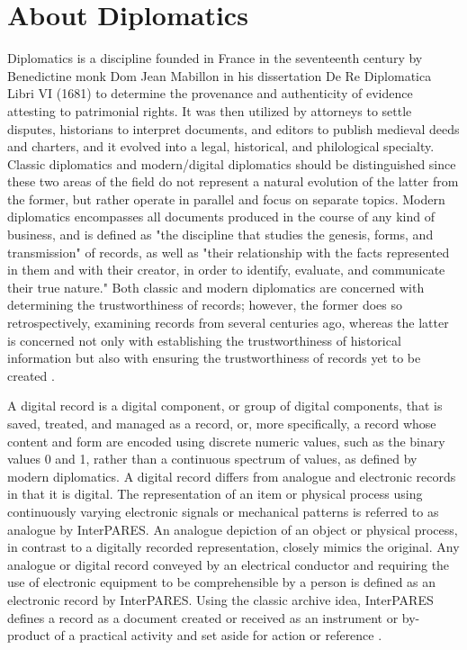 \section{About Diplomatics}
Diplomatics is a discipline founded in France in the seventeenth century by Benedictine monk Dom Jean Mabillon in his dissertation De Re Diplomatica Libri VI (1681) to determine the provenance and authenticity of evidence attesting to patrimonial rights. It was then utilized by attorneys to settle disputes, historians to interpret documents, and editors to publish medieval deeds and charters, and it evolved into a legal, historical, and philological specialty.
Classic diplomatics and modern/digital diplomatics should be distinguished since these two areas of the field do not represent a natural evolution of the latter from the former, but rather operate in parallel and focus on separate topics. Modern diplomatics encompasses all documents produced in the course of any kind of business, and is defined as "the discipline that studies the genesis, forms, and transmission" of records, as well as "their relationship with the facts represented in them and with their creator, in order to identify, evaluate, and communicate their true nature."
Both classic and modern diplomatics are concerned with determining the trustworthiness of records; however, the former does so retrospectively, examining records from several centuries ago, whereas the latter is concerned not only with establishing the trustworthiness of historical information but also with ensuring the trustworthiness of records yet to be created \cite[10]{kirschenbaum2010digital}. 

A digital record is a digital component, or group of digital components, that is saved, treated, and managed as a record, or, more specifically, a record whose content and form are encoded using discrete numeric values, such as the binary values 0 and 1, rather than a continuous spectrum of values, as defined by modern diplomatics. A digital record differs from analogue and electronic records in that it is digital. The representation of an item or physical process using continuously varying electronic signals or mechanical patterns is referred to as analogue by InterPARES.
An analogue depiction of an object or physical process, in contrast to a digitally recorded representation, closely mimics the original. Any analogue or digital record conveyed by an electrical conductor and requiring the use of electronic equipment to be comprehensible by a person is defined as an electronic record by InterPARES. Using the classic archive idea, InterPARES defines a record as a document created or received as an instrument or by-product of a practical activity and set aside for action or reference \cite[52]{duranti2009digital}.

